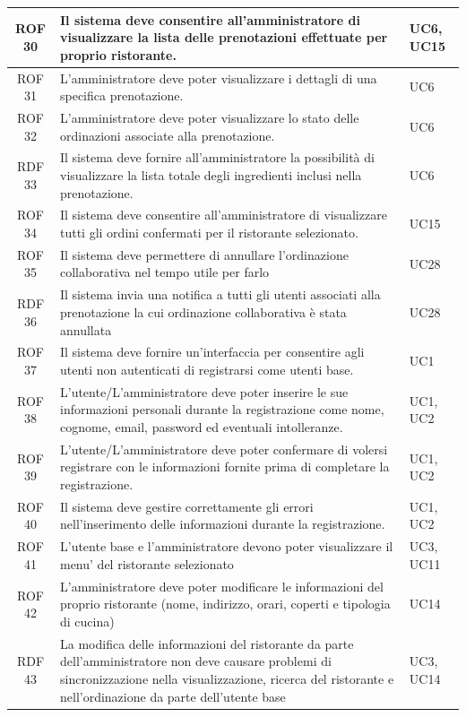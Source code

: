 \documentclass[12pt, oneside]{article}
\begin{document}
\begin{longtable}{|c|p{14cm}|p{2cm}|}
    ROF 30& Il sistema deve consentire all'amministratore di visualizzare la lista delle prenotazioni effettuate per proprio ristorante. & UC6, UC15 \\
    \hline
    ROF 31& L'amministratore deve poter visualizzare i dettagli di una specifica prenotazione. & UC6 \\
    \hline
    ROF 32& L'amministratore deve poter visualizzare lo stato delle ordinazioni associate alla prenotazione. & UC6 \\
    \hline
    RDF 33& Il sistema deve fornire all'amministratore la possibilità di visualizzare la lista totale degli ingredienti inclusi nella prenotazione. & UC6 \\
    \hline
    ROF 34& Il sistema deve consentire all'amministratore di visualizzare tutti gli ordini confermati per il ristorante selezionato. & UC15 \\
    \hline
    ROF 35& Il sistema deve permettere di annullare l'ordinazione collaborativa nel tempo utile per farlo & UC28 \\
    \hline
    RDF 36& Il sistema invia una notifica a tutti gli utenti associati alla prenotazione la cui ordinazione collaborativa è stata annullata & UC28 \\
    \hline
    ROF 37& Il sistema deve fornire un'interfaccia per consentire agli utenti non autenticati di registrarsi come utenti base. & UC1 \\
    \hline
    ROF 38& L'utente/L'amministratore deve poter inserire le sue informazioni personali durante la registrazione come nome, cognome, email, password ed eventuali intolleranze. & UC1, UC2 \\
    \hline
    ROF 39& L'utente/L'amministratore deve poter confermare di volersi registrare con le informazioni fornite prima di completare la registrazione. & UC1, UC2 \\
    \hline
    ROF 40& Il sistema deve gestire correttamente gli errori nell'inserimento delle informazioni durante la registrazione. & UC1, UC2 \\
    \hline 
    ROF 41& L'utente base e l'amministratore devono poter visualizzare il menu' del ristorante selezionato & UC3, UC11\\
    \hline
    ROF 42& L'amministratore deve poter modificare le informazioni del proprio ristorante (nome, indirizzo, orari, coperti e tipologia di cucina) & UC14\\
    \hline
    RDF 43& La modifica delle informazioni del ristorante da parte dell'amministratore non deve causare problemi di sincronizzazione nella visualizzazione, ricerca del ristorante e nell'ordinazione da parte dell'utente base & UC3, UC14 \\

\end{longtable}
\end{document}
